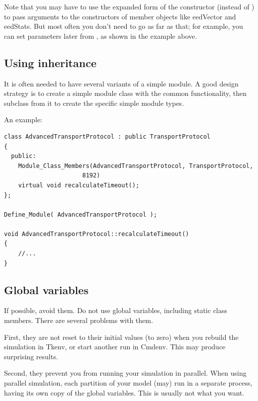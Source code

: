 \begin{sloppypar}
Note that you may have to use the expanded form of the
constructor (instead of
) to pass arguments to the constructors
of member objects like eedVector and eedStats. But most often you
don't need to go as far as that; for example, you can set parameters
later from , as shown in the example above.
\end{sloppypar}



\subsection{Using inheritance}

It is often needed to have several variants of a simple module.
A good design strategy is to create a simple module class with
the common functionality, then subclass from it to create the
specific simple module types.

An example:

\begin{verbatim}
class AdvancedTransportProtocol : public TransportProtocol
{
  public:
    Module_Class_Members(AdvancedTransportProtocol, TransportProtocol,
                      8192)
    virtual void recalculateTimeout();
};

Define_Module( AdvancedTransportProtocol );

void AdvancedTransportProtocol::recalculateTimeout()
{
    //...
}
\end{verbatim}


\subsection{Global variables}

If possible, avoid them. Do not use global variables, including
static class members. There are several problems with them.

First, they are not reset to their initial values (to zero)
when you rebuild the simulation in Tkenv, or start another run
in Cmdenv. This may produce surprising results.

Second, they prevent you from running your simulation in parallel.
When using parallel simulation, each partition of your model
(may) run in a separate process, having its own copy of the
global variables. This is usually not what you want.





